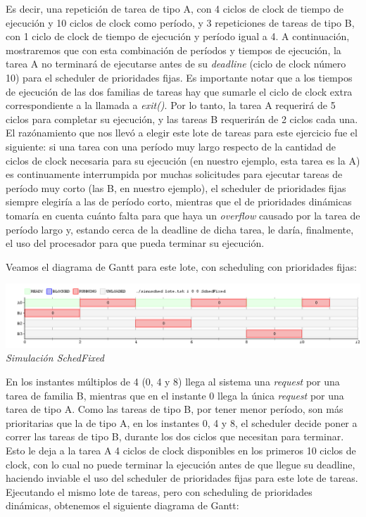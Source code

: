 Es decir, una repetici\'on de tarea de tipo A, con 4 ciclos de clock de tiempo de ejecuci\'on y 10 ciclos de clock como per\'iodo, y 3 repeticiones 
de tareas de tipo B, con 1 ciclo de clock de tiempo de ejecuci\'on y per\'iodo igual a 4. A continuaci\'on, mostraremos que con esta combinaci\'on
de per\'iodos y tiempos de ejecuci\'on, la tarea A no terminar\'a de ejecutarse antes de su \textit{deadline} (ciclo de clock n\'umero 10) 
para el scheduler de prioridades fijas. Es importante notar que a los tiempos de ejecuci\'on de las dos familias de tareas hay que sumarle el ciclo
de clock extra correspondiente a la llamada a \textit{exit()}. Por lo tanto, la tarea A requerir\'a de 5 ciclos para completar su ejecuci\'on, y las tareas 
B requerir\'an de 2 ciclos cada una. 
\\
El raz\'onamiento que nos llev\'o a elegir este lote de tareas para este ejercicio fue el siguiente: si una tarea con una per\'iodo muy largo respecto
de la cantidad de ciclos de clock necesaria para su ejecuci\'on (en nuestro ejemplo, esta tarea es la A) es continuamente interrumpida por muchas 
solicitudes para ejecutar tareas de per\'iodo muy corto (las B, en nuestro ejemplo), el scheduler de prioridades fijas siempre elegir\'ia a las de 
per\'iodo corto, mientras que el de prioridades din\'amicas tomar\'ia en cuenta cu\'anto falta para que haya un \textit{overflow} causado por la tarea de
per\'iodo largo y, estando cerca de la deadline de dicha tarea, le dar\'ia, finalmente, el uso del procesador para que pueda terminar su ejecuci\'on.

Veamos el diagrama de Gantt para este lote, con scheduling con prioridades fijas:

\vspace{\baselineskip}
\begin{center}
\includegraphics[scale=0.45]{../tp1/Test/ejercicio9-1.png}
\\
\vspace{1pt}
\footnotesize\textit{Simulaci\'on SchedFixed}
\end{center}
\vspace{\baselineskip}

En los instantes m\'ultiplos de 4 (0, 4 y 8) llega al sistema una \textit{request} por una tarea de familia B, mientras que en el instante 0 llega la \'unica 
\textit{request} por una tarea de tipo A. Como las tareas de tipo B, por tener menor per\'iodo, son m\'as prioritarias que la de tipo A, en los instantes
0, 4 y 8, el scheduler decide poner a correr las tareas de tipo B, durante los dos ciclos que necesitan para terminar. Esto le deja a la tarea A
4 ciclos de clock disponibles en los primeros 10 ciclos de clock, con lo cual no puede terminar la ejecuci\'on antes de que llegue su deadline,
haciendo inviable el uso del scheduler de prioridades fijas para este lote de tareas.
\\
Ejecutando el mismo lote de tareas, pero con scheduling de prioridades din\'amicas, obtenemos el siguiente diagrama de Gantt:

